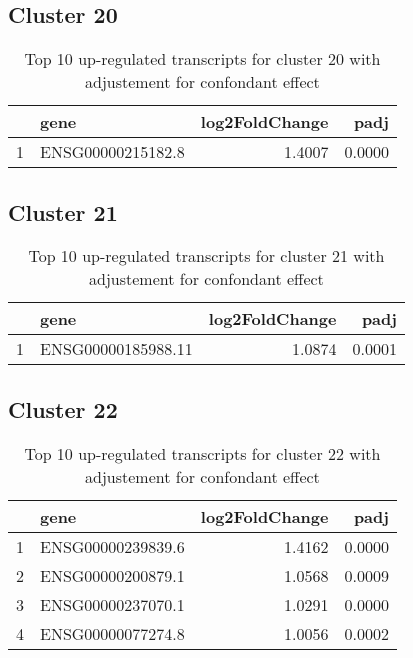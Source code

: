 \documentclass{article}
\begin{document}
\subsection{Cluster 20 }
\begin{table}[H]
\centering
\begin{tabular}{rlrr}
  \hline
 & gene & log2FoldChange & padj \\ 
  \hline
1 & ENSG00000215182.8 & 1.4007 & 0.0000 \\ 
   \hline
\end{tabular}
\caption{Top 10 up-regulated transcripts for cluster 20 with adjustement for confondant effect} 
\label{tab:q3_1_conf_20}
\end{table}
\subsection{Cluster 21 }
\begin{table}[H]
\centering
\begin{tabular}{rlrr}
  \hline
 & gene & log2FoldChange & padj \\ 
  \hline
1 & ENSG00000185988.11 & 1.0874 & 0.0001 \\ 
   \hline
\end{tabular}
\caption{Top 10 up-regulated transcripts for cluster 21 with adjustement for confondant effect} 
\label{tab:q3_1_conf_21}
\end{table}
\subsection{Cluster 22 }
\begin{table}[H]
\centering
\begin{tabular}{rlrr}
  \hline
 & gene & log2FoldChange & padj \\ 
  \hline
1 & ENSG00000239839.6 & 1.4162 & 0.0000 \\ 
  2 & ENSG00000200879.1 & 1.0568 & 0.0009 \\ 
  3 & ENSG00000237070.1 & 1.0291 & 0.0000 \\ 
  4 & ENSG00000077274.8 & 1.0056 & 0.0002 \\ 
   \hline
\end{tabular}
\caption{Top 10 up-regulated transcripts for cluster 22 with adjustement for confondant effect} 
\label{tab:q3_1_conf_22}
\end{table}
\end{document}
